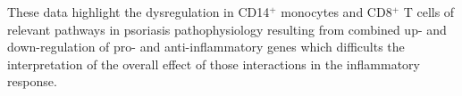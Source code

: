 These data highlight the dysregulation in CD14$^+$ monocytes and CD8$^+$ T cells of relevant pathways in psoriasis pathophysiology resulting from combined up- and down-regulation of pro- and anti-inflammatory genes which difficults the interpretation of the overall effect of those interactions in the inflammatory response.







